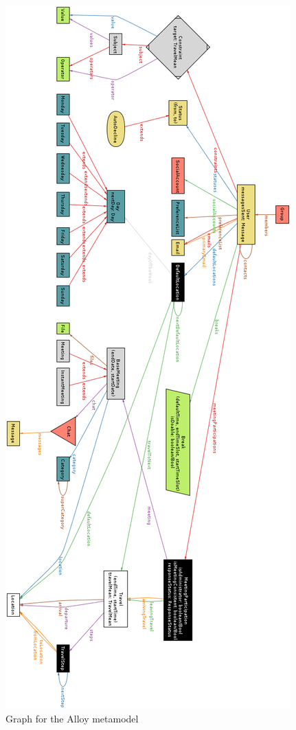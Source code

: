 \begin{figure}
	\vspace*{-0.5cm}
	\centering\includegraphics[height=\textheight]{Images/AlloyMetamodel.png}
	\caption{Graph for the Alloy metamodel}
\end{figure}

